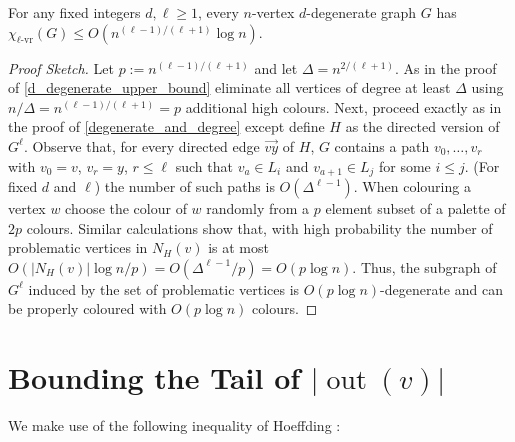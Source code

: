 \documentclass{patmorin}
\DeclareMathOperator{\outn}{out}
\newcommand{\rn}[1]{\chi_{\operatorname{#1-vr}}}
\newcommand{\lrn}{\rn{\ell}}
\begin{document}
\begin{thm}
  For any fixed integers $d,\ell\ge 1$, every $n$-vertex $d$-degenerate graph $G$ has $\lrn(G) \le O(n^{(\ell-1)/(\ell+1)}\log  n)$.
\end{thm}

\begin{proof}[Proof Sketch]
  Let $p:=n^{(\ell-1)/(\ell+1)}$ and let $\Delta=n^{2/(\ell+1)}$.  As in the proof of \cref{d_degenerate_upper_bound} eliminate all vertices of degree at least $\Delta$ using $n/\Delta = n^{(\ell-1)/(\ell+1)}=p$ additional high colours.  Next, proceed exactly as in the proof of \cref{degenerate_and_degree} except define $H$ as the directed version of $G^{\ell}$.  Observe that, for every directed edge $\overrightarrow{vy}$ of $H$, $G$ contains a path $v_0,\ldots,v_r$ with $v_0=v$, $v_r=y$, $r\le \ell$ such that $v_a\in L_i$ and $v_{a+1}\in L_j$ for some $i\le j$.  (For fixed $d$ and $\ell$) the number of such paths is $O(\Delta^{\ell-1})$. When colouring a vertex $w$ choose the colour of $w$ randomly from a $p$ element subset of a palette of $2p$ colours.  Similar calculations show that, with high probability the number of problematic vertices in $N_{H}(v)$ is at most $O(|N_{H}(v)|\log n/p)=O(\Delta^{\ell-1}/p)=O(p\log n)$.  Thus, the subgraph of $G^\ell$ induced by the set of problematic vertices is $O(p\log n)$-degenerate and can be properly coloured with $O(p\log n)$ colours.
\end{proof}






\appendix

\section{Bounding the Tail of \texorpdfstring{\boldmath$|\outn(v)|$}{out(v)}}

We make use of the following inequality of Hoeffding \cite[Theorem~2.8]{boucheron.lugosi.ea:concentration}:
\end{document}

